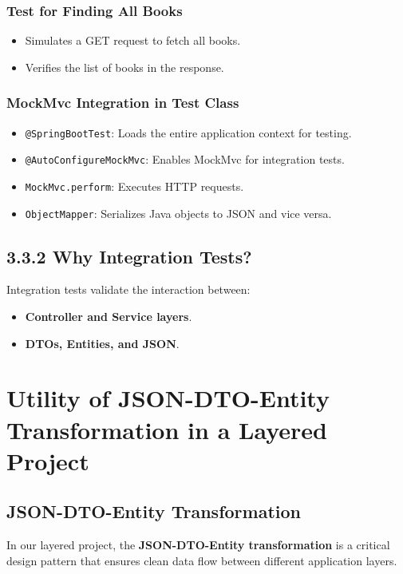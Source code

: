 \documentclass[a4paper,12pt]{article}
\begin{document}
\subsubsection{ Test for Finding All Books}
\begin{itemize}
    \item Simulates a GET request to fetch all books.
    \item Verifies the list of books in the response.
\end{itemize}

\subsubsection{MockMvc Integration in Test Class}
\begin{itemize}
    \item \texttt{@SpringBootTest}: Loads the entire application context for testing.
    \item \texttt{@AutoConfigureMockMvc}: Enables MockMvc for integration tests.
    \item \texttt{MockMvc.perform}: Executes HTTP requests.
    \item \texttt{ObjectMapper}: Serializes Java objects to JSON and vice versa.
\end{itemize}

\subsection{3.3.2 Why Integration Tests?}
Integration tests validate the interaction between:
\begin{itemize}
    \item \textbf{Controller and Service layers}.
    \item \textbf{DTOs, Entities, and JSON}.
\end{itemize}
\section{Utility of JSON-DTO-Entity Transformation in a Layered Project}

\subsection{JSON-DTO-Entity Transformation}

In our layered project, the \textbf{JSON-DTO-Entity transformation} is a critical design pattern that ensures clean data flow between different application layers.
\end{document}
